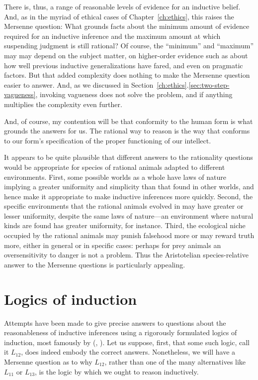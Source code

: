 There is, thus, a range of reasonable levels of evidence for an inductive belief. And, as in the myriad of ethical
cases of Chapter~\ref{ch:ethics}, this raises the Mersenne question: What grounds facts about the minimum amount of 
evidence required for an inductive inference and the maximum amount at which suspending judgment is still rational? 
Of course, the ``minimum'' and ``maximum'' may may depend on the subject matter, on higher-order evidence such as about 
how well previous inductive generalizations have fared, and even on pragmatic factors. But that added complexity does
nothing to make the Mersenne question easier to answer. And, as we discussed in Section~\ref{ch:ethics}.\ref{sec:two-step-vagueness}, invoking vagueness does not
solve the problem, and if anything multiplies the complexity even further.

And, of course, my contention will be that conformity to the human form is what grounds the answers for us. The
rational way to reason is the way that conforms to our form's specification of the proper functioning of our intellect.

It appears to be quite plausible that different answers to the rationality questions would be appropriate
for species of rational animals adapted to different environments. First, some possible worlds as a whole have 
laws of nature implying a greater uniformity and simplicity than that found in other worlds, and hence make it appropriate to make 
inductive inferences more quickly. Second, the specific environments that the rational animals evolved in may have greater or 
lesser uniformity, despite the same laws of nature---an environment where natural kinds are found has greater uniformity,
for instance. Third, the ecological niche occupied by the rational animals may
punish falsehood more or may reward truth more, either in general or in specific cases: perhaps for prey animals 
an oversensitivity to danger is not a problem. Thus the Aristotelian 
species-relative answer to the Mersenne questions is particularly appealing.

\section{Logics of induction}\label{sec:Carnap}
Attempts have been made to give precise answers to questions about the reasonableness of inductive 
inferences using a rigorously formulated logics of induction, most famously by \citeauthor{CarnapLFP2} (\citeyear{CarnapLFP2}, \citeyear{CarnapContinuum}). Let us suppose, first, that some such
logic, call it $L_{12}$, does indeed embody the correct answers. Nonetheless, we will have a Mersenne question
as to why $L_{12}$, rather than one of the many alternatives like $L_{11}$ or $L_{13}$, is the logic by which we ought to reason 
inductively. 

